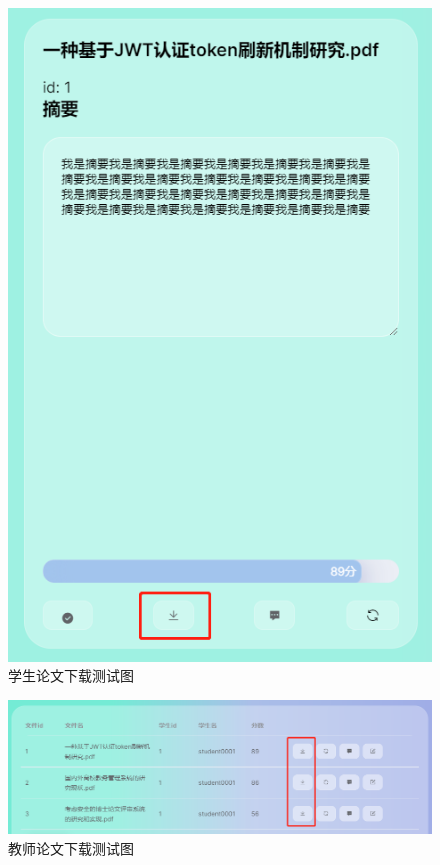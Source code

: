 \begin{figure}[H]
  \centering
  \includegraphics[scale = 0.6]{out/figure/测试/download-student-test.png}
  \caption{\song\wuhao 学生论文下载测试图}
  \label{download-student-test}
\end{figure}

\begin{figure}[H]
  \centering
  \includegraphics[scale = 0.6]{out/figure/测试/download-teacher-test.png}
  \caption{\song\wuhao 教师论文下载测试图}
  \label{download-teacher-test}
\end{figure}

